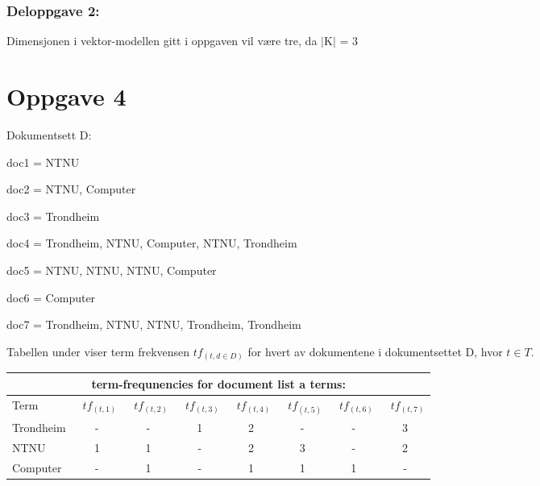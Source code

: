 \documentclass[]{article}
\begin{document}
\vspace{10mm}

\subsubsection{Deloppgave 2:}

Dimensjonen i vektor-modellen gitt i oppgaven vil være tre, da $\mid$K$\mid$ = 3


\pagebreak

\section{Oppgave 4}

Dokumentsett D:
\vspace{1mm}

doc1 = NTNU

doc2 = NTNU, Computer

doc3 = Trondheim

doc4 = Trondheim, NTNU, Computer, NTNU, Trondheim

doc5 = NTNU, NTNU, NTNU, Computer

doc6 = Computer

doc7 = Trondheim, NTNU, NTNU, Trondheim, Trondheim 
\vspace{5 mm}


Tabellen under viser term frekvensen $tf_{(t,d \in D)}$ for hvert av dokumentene i dokumentsettet D, hvor $t \in T$.
\vspace{5 mm}

\begin{center}
\begin{tabular}[t]{|l|ccccccc|}

\multicolumn{8}{c}{term-frequnencies for document list a terms:}\\\hline

Term&\ $tf_{(t,1)}$&\ $tf_{(t,2)}$&\ $tf_{(t,3)}$&\ $tf_{(t,4)}$&\ $tf_{(t,5)}$&\ $tf_{(t,6)}$&\ $tf_{(t,7)}$\\\hline

Trondheim&-&-&1&2&-&-&3\\

NTNU&1&1&-&2&3&-&2\\

Computer&-&1&-&1&1&1&-\\\hline
\end{tabular}
\end{center}
\vspace{10 mm}
\end{document}
